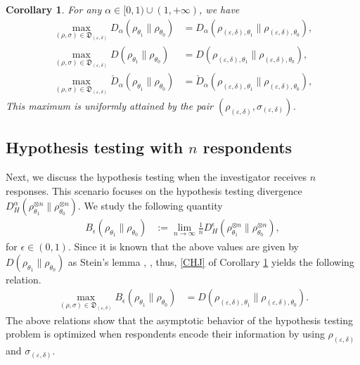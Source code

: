 \documentclass[onecolumn,ldraftcls, 11pt]{IEEEtran}
\newcommand{\eps}{\varepsilon}
\newtheorem{corollary}{Corollary}
\begin{document}
\begin{corollary}\label{Cor12}
        For any $\alpha \in [0,1) \cup (1,+\infty)$, we have
\begin{align}
\max_{(\rho,\sigma) \in \mathfrak{D}_{(\eps,\delta)}} D_{\alpha}( \rho_{\theta_1}\|\rho_{\theta_0}) 
&= D_{\alpha}( \rho_{(\eps,\delta),\theta_1}\|\rho_{(\eps,\delta),\theta_0}),\\
\max_{(\rho,\sigma) \in \mathfrak{D}_{(\eps,\delta)}} D( \rho_{\theta_1}\|\rho_{\theta_0}) 
&= D( \rho_{(\eps,\delta),\theta_1}\|\rho_{(\eps,\delta),\theta_0}),\label{CHJ}\\
\max_{(\rho,\sigma) \in \mathfrak{D}_{(\eps,\delta)}} \check{D}_{\alpha}( \rho_{\theta_1}\|\rho_{\theta_0}) 
&= \check{D}_{\alpha}( \rho_{(\eps,\delta),\theta_1}\|\rho_{(\eps,\delta),\theta_0}),\label{HJ1}
\end{align}
This maximum is uniformly attained by the pair $(\rho_{(\eps,\delta)}, \sigma_{(\eps,\delta)})$.
\end{corollary}

\subsection{Hypothesis testing with $n$ respondents}
Next, we discuss the hypothesis testing 
when the investigator receives $n$ responses.
This scenario focuses on the hypothesis testing divergence $D_H^\alpha( \rho_{\theta_1}^{\otimes n}\|\rho_{\theta_0}^{\otimes n})$.
We study the following quantity
\begin{align}
B_\epsilon(\rho_{\theta_1} \|\rho_{\theta_0})
&:=\lim_{n\to \infty}\frac{1}{n}D_H^\epsilon( \rho_{\theta_1}^{\otimes n}\|\rho_{\theta_0}^{\otimes n}),
\end{align}
for $\epsilon\in (0,1)$.
Since it is known that the above values are given 
by $D(\rho_{\theta_1}\|\rho_{\theta_0})$ as Stein's lemma \cite{Hiai1991,887855}, 
\cite[Chapter 3]{H2017QIT}, thus, \eqref{CHJ} of Corollary \ref{Cor12} yields the following relation.
\begin{align}
\max_{(\rho,\sigma) \in \mathfrak{D}_{(\eps,\delta)}} B_\epsilon( \rho_{\theta_1}\|\rho_{\theta_0}) 
&= D( \rho_{(\eps,\delta),\theta_1}\|\rho_{(\eps,\delta),\theta_0}).
\end{align}
The above relations show that
the asymptotic behavior of the hypothesis testing problem 
is optimized
when respondents encode their information by using 
$\rho_{(\eps,\delta)}$ and $\sigma_{(\eps,\delta)}$.
\end{document}
